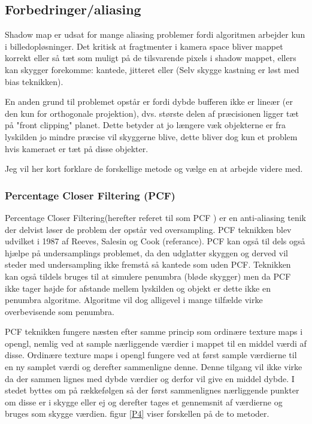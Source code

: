 \documentclass[11pt,a4paper]{article}
\begin{document}
\newpage 

\subsection{Forbedringer/aliasing}

Shadow map  er udsat for mange aliasing problemer fordi algoritmen arbejder kun i billedopløsninger. Det kritisk at fragtmenter i kamera space bliver mappet korrekt eller så tæt som muligt på de tilsvarende pixels i shadow mappet, ellers kan skygger forekomme: kantede, jitteret eller (Selv skygge kastning er løst med bias teknikken). 

En anden grund til problemet opstår er fordi dybde bufferen ikke er lineær (er den kun for orthogonale projektion), dvs. største delen af præcisionen ligger tæt på "front clipping" planet. Dette betyder at jo længere væk objekterne er fra lyskilden jo mindre præcise vil skyggerne blive, dette bliver dog kun et problem hvis kameraet er tæt på disse objekter. 


Jeg vil her kort forklare de forskellige metode og vælge en at arbejde videre med.

\subsubsection{Percentage Closer Filtering (PCF)}

Percentage Closer Filtering(herefter referet til som PCF ) er en anti-aliasing tenik der delvist løser de problem der opstår ved oversampling. PCF teknikken blev udvilket i 1987 af Reeves, Salesin og Cook (referance). PCF kan også til dels også hjælpe på undersamplings problemet, da den udglatter skyggen og derved vil steder med undersampling ikke fremstå så kantede som uden PCF. Teknikken kan også tildels bruges til at simulere penumbra (bløde skygger) men da PCF ikke tager højde for afstande mellem lyskilden og objekt er dette ikke en penumbra algoritme. Algoritme vil dog alligevel i mange tilfælde virke overbevisende som penumbra.

PCF teknikken fungere næsten efter samme princip som ordinære texture maps i opengl, nemlig ved at sample nærliggende værdier i mappet til en middel værdi af disse. Ordinære texture maps i opengl fungere ved at først sample værdierne til en ny samplet værdi og derefter sammenligne denne. Denne tilgang vil ikke virke da der sammen lignes med dybde værdier og derfor vil give en middel dybde. I stedet byttes om på rækkefølgen så  der først sammenlignes nærliggende punkter om disse er i skygge eller ej og derefter tages et gennemsnit af værdierne og bruges som skygge værdien. figur \ref{P4} viser forskellen på de to metoder.
\end{document}
